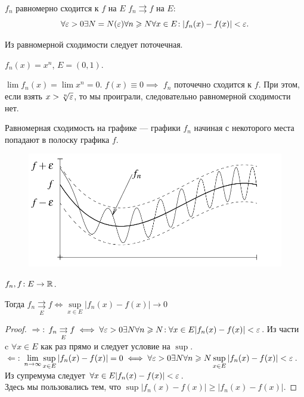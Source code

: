 \begin{definition}
    $f_n$ равномерно сходится к  $f$ на  $E$  $f_n \rightrightarrows f$ на $E$:
     \[
    \forall \varepsilon > 0 \exists N=N(\varepsilon) \forall n \geqslant N \forall x \in E\!: |f_n(x) - f(x)| < \varepsilon
    .\] 
\end{definition}
\begin{remark}
    Из равномерной сходимости следует поточечная.
\end{remark}
\begin{example}
    $f_n(x) = x^n$,  $E = (0, 1)$.

     $\lim f_n(x) = \lim x^n = 0$. $f(x) \equiv 0 \implies $  $f_n$ поточечно сходится к  $f$. При этом, если взять  $x > \sqrt[n]{\varepsilon}$, то мы проиграли, следовательно равномерной сходимости нет.
\end{example}
\begin{remark}
    Равномерная сходимость на графике --- графики $f_n$ начиная с некоторого места попадают в полоску графика  $f$.
\end{remark}
\begin{figure}[!h]
	\includegraphics[scale=0.45]{uniform_conv}
\end{figure}
\begin{theorem}
    $f_n, f\!:E \to \mathbb{R}$. 

    Тогда  $f_n \underset{E}{\rightrightarrows} f \iff \sup\limits_{x \in E} |f_n(x) - f(x)| \to 0$
\end{theorem}
\begin{proof}
    $\Rightarrow$: $f_n \underset{E}{\rightrightarrows} f \iff \forall \varepsilon > 0 \exists N \forall n \geqslant N\!: \forall x \in E |f_n(x) - f(x)| < \varepsilon$. Из части c $\forall x \in E$ как раз прямо и следует условие на  $\sup$.\\
    $\Leftarrow$: $\lim\limits_{n \to \infty} \sup\limits_{x \in E} |f_n(x) - f(x)| = 0 \iff \forall \varepsilon > 0 \exists N \forall n \geqslant N \sup\limits_{x \in E}|f_n(x) - f(x)| < \varepsilon$. Из супремума следует $\forall x \in E |f_n(x) - f(x)| < \varepsilon$.\\
    Здесь мы пользовались тем, что $\sup|f_n(x) - f(x)| \geq |f_n(x) - f(x)|$.
\end{proof}
